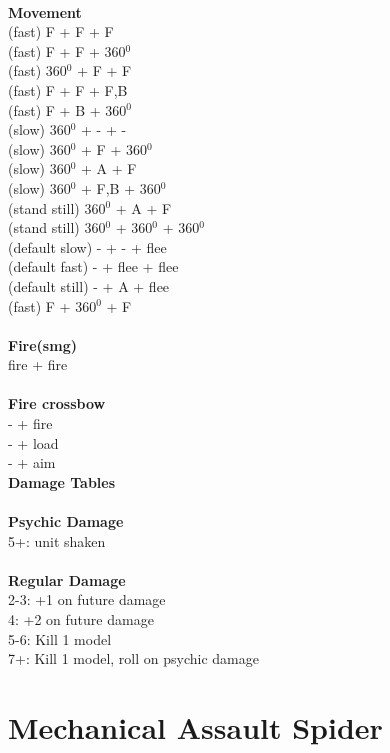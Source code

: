 \ \\ {\bf Movement } \\
(fast) F + F + F  \\
(fast) F + F + 360$^0$ \\
(fast) 360$^0$ + F + F \\
(fast) F + F + F,B \\
(fast) F + B + 360$^0$ \\
(slow) 360$^0$ + - + - \\
(slow) 360$^0$ + F + 360$^0$ \\
(slow) 360$^0$ + A + F \\
(slow) 360$^0$ + F,B + 360$^0$ \\
(stand still) 360$^0$ + A + F \\
(stand still) 360$^0$ + 360$^0$ + 360$^0$ \\
(default slow) - + - + flee \\
(default fast) - + flee + flee \\
(default still) - + A + flee \\
(fast) F + 360$^0$ + F \\
\ \\ {\bf Fire(smg) } \\
fire + fire \\
\ \\ {\bf Fire crossbow } \\
- + fire \\
- + load \\
- + aim \\



{\bf Damage Tables} \\
\ \\ {\bf Psychic Damage } \\
5+: unit shaken \\
\ \\ {\bf Regular Damage } \\
2-3: +1 on future damage \\
4: +2 on future damage \\
5-6: Kill 1 model \\
7+: Kill 1 model, roll on psychic damage \\









\pagebreak

\section{ Mechanical Assault Spider }

